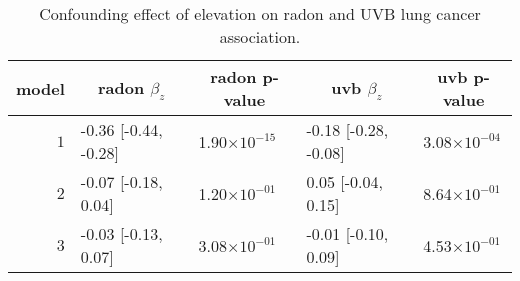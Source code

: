 \begin{table}[!tbp]
\caption{Confounding effect of elevation on radon and UVB lung cancer association.\label{tab:confounding}} 
\begin{center}
\begin{tabular}{rllll}
\hline\hline
\multicolumn{1}{c}{model}&\multicolumn{1}{c}{radon $\beta_z$}&\multicolumn{1}{c}{radon p-value}&\multicolumn{1}{c}{uvb $\beta_z$}&\multicolumn{1}{c}{uvb p-value}\tabularnewline
\hline
$1$&-0.36 [-0.44, -0.28]&1.90$\times10^{-15}$&-0.18 [-0.28, -0.08]&3.08$\times10^{-04}$\tabularnewline
$2$&-0.07 [-0.18, 0.04]&1.20$\times10^{-01}$&0.05 [-0.04, 0.15]&8.64$\times10^{-01}$\tabularnewline
$3$&-0.03 [-0.13, 0.07]&3.08$\times10^{-01}$&-0.01 [-0.10, 0.09]&4.53$\times10^{-01}$\tabularnewline
\hline
\end{tabular}\end{center}

\end{table}
